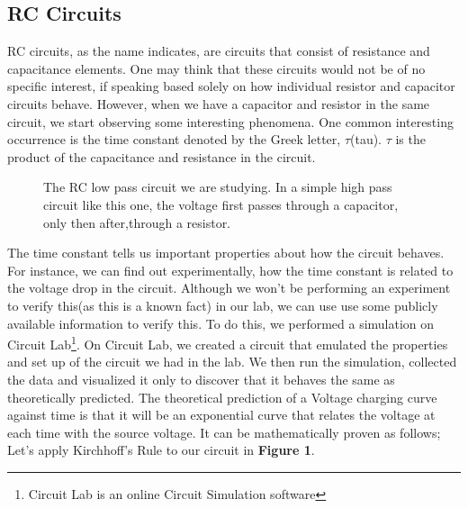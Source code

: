 \documentclass[twocolumn]{article}\usepackage[english]{babel}
\begin{document}
\subsection{RC Circuits}
RC circuits, as the name indicates, are circuits that consist of resistance and capacitance elements. One may think that these circuits would not be of no specific interest, if speaking based solely on how individual resistor and capacitor circuits behave. However, when we have a capacitor and resistor in the same circuit, we start observing some interesting phenomena. One common interesting occurrence is the time constant denoted by the Greek letter, $\tau$(tau). $\tau$ is the product of the capacitance and resistance in the circuit.
\newline
\newline
\newline
\begin{figure}
\caption{The RC low pass circuit we are studying. In a simple high pass circuit like this one, the voltage first passes through a capacitor, only then after,through a resistor. }
\label{fig:High Pass Cir}
\end{figure}

The time constant tells us important properties about how the circuit behaves. For instance, we can find out experimentally, how the time constant is related to the voltage drop in the circuit. Although we won't be performing an experiment to verify this(as this is a known fact) in our lab, we can use use some publicly available information to verify this. To do this, we performed a simulation on Circuit Lab\footnote{Circuit Lab is an online Circuit Simulation software}. On Circuit Lab, we created a circuit that emulated the properties and set up of the circuit we had in the lab. We then run the simulation, collected the data and visualized it only to discover that it behaves the same as theoretically predicted.
\newline
\newline
The theoretical prediction of a Voltage charging curve against time is that it will be an exponential curve that relates the voltage at each time with the source voltage. It can be mathematically proven as follows;
Let's apply Kirchhoff's Rule to our circuit in \textbf{Figure 1}.\newline
\end{document}
